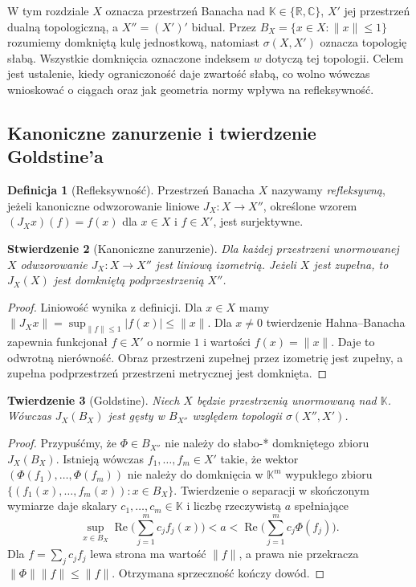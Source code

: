 \documentclass[11pt,a4paper]{article}
\numberwithin{equation}{section}
\theoremstyle{plain}
\newtheorem{twierdzenie}{Twierdzenie}[section]
\newtheorem{stwierdzenie}[twierdzenie]{Stwierdzenie}
\theoremstyle{definition}
\newtheorem{definicja}[twierdzenie]{Definicja}
\theoremstyle{remark}
\newcommand{\R}{\mathbb R}
\newcommand{\C}{\mathbb C}
\newcommand{\K}{\mathbb K}
\begin{document}
W tym rozdziale $X$ oznacza przestrzeń Banacha nad $\K\in\{\R,\C\}$,
$X'$ jej przestrzeń dualną topologiczną, a $X''=(X')'$ bidual.
Przez $B_X=\{x\in X:\|x\|\le1\}$ rozumiemy domkniętą kulę
jednostkową, natomiast $\sigma(X,X')$ oznacza topologię słabą.
Wszystkie domknięcia oznaczone indeksem $w$ dotyczą tej topologii.
Celem jest ustalenie, kiedy ograniczoność daje zwartość słabą,
co wolno wówczas wnioskować o ciągach oraz jak geometria normy
wpływa na refleksywność.

\subsection{Kanoniczne zanurzenie i twierdzenie Goldstine'a}

\begin{definicja}[Refleksywność]
\label{def:refleksywnosc26}
Przestrzeń Banacha $X$ nazywamy \emph{refleksywną}, jeżeli
kanoniczne odwzorowanie liniowe
$J_X:X\to X''$, określone wzorem
$(J_Xx)(f)=f(x)$ dla $x\in X$ i $f\in X'$, jest surjektywne.
\end{definicja}

\begin{stwierdzenie}[Kanoniczne zanurzenie]
\label{prop:canonical26}
Dla każdej przestrzeni unormowanej $X$ odwzorowanie
$J_X:X\to X''$ jest liniową izometrią. Jeżeli $X$ jest zupełna,
to $J_X(X)$ jest domkniętą podprzestrzenią $X''$.
\end{stwierdzenie}
\begin{proof}
Liniowość wynika z definicji. Dla $x\in X$ mamy
$\|J_Xx\|=\sup_{\|f\|\le1}|f(x)|\le\|x\|$.
Dla $x\ne0$ twierdzenie Hahna--Banacha zapewnia funkcjonał
$f\in X'$ o normie $1$ i wartości $f(x)=\|x\|$.
Daje to odwrotną nierówność. Obraz przestrzeni zupełnej
przez izometrię jest zupełny, a zupełna podprzestrzeń
przestrzeni metrycznej jest domknięta.
\end{proof}

\begin{twierdzenie}[Goldstine]
\label{thm:goldstine26}
Niech $X$ będzie przestrzenią unormowaną nad $\K$.
Wówczas $J_X(B_X)$ jest gęsty w $B_{X''}$ względem topologii
$\sigma(X'',X')$.
\end{twierdzenie}
\begin{proof}
Przypuśćmy, że $\Phi\in B_{X''}$ nie należy do
słabo-* domkniętego zbioru $J_X(B_X)$.
Istnieją wówczas $f_1,\ldots,f_m\in X'$ takie, że wektor
$(\Phi(f_1),\ldots,\Phi(f_m))$ nie należy do domknięcia
w $\K^m$ wypukłego zbioru
$\{(f_1(x),\ldots,f_m(x)):x\in B_X\}$.
Twierdzenie o separacji w skończonym wymiarze daje skalary
$c_1,\ldots,c_m\in\K$ i liczbę rzeczywistą $a$ spełniające
\[
\sup_{x\in B_X}\operatorname{Re}\Big(\sum_{j=1}^m c_jf_j(x)\Big)
<a<\operatorname{Re}\Big(\sum_{j=1}^m c_j\Phi(f_j)\Big).
\]
Dla $f=\sum_jc_jf_j$ lewa strona ma wartość $\|f\|$,
a prawa nie przekracza $\|\Phi\|\|f\|\le\|f\|$.
Otrzymana sprzeczność kończy dowód.
\end{proof}
\end{document}
